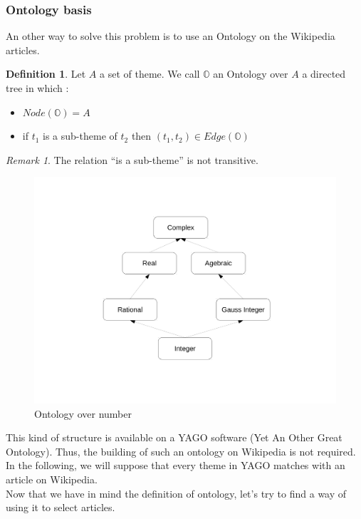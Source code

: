 \documentclass[11pt]{article}
\theoremstyle{plain}
\theoremstyle{definition}
\newtheorem{defn}{Definition}[section]
\theoremstyle{remark}
\newtheorem*{rem}{Remark}
\begin{document}
\subsubsection{Ontology basis}

An other way to solve this problem is to use an Ontology on the Wikipedia articles.

\vspace*{5mm}
\begin{defn}
  Let $A$ a set of theme. We call $\mathbb{O}$ an Ontology over $A$ a directed tree in which :
  \begin{itemize}
  \item $ Node(\mathbb{O}) = A$
  \item if $t_1$ is a sub-theme of $t_2$ then $(t_1,t_2) \in Edge(\mathbb{O})$
  \end{itemize}
\end{defn}

\vspace*{5mm}

\begin{rem}
  The relation ``is a sub-theme'' is not transitive.
\end{rem}

\begin{figure}[!h]
	\centering
    \includegraphics[scale = 0.3]{ExOntology.pdf}
    \caption{Ontology over number}
\end{figure}

This kind of structure is available on a YAGO software (Yet An Other Great Ontology). Thus, the building of such an ontology on Wikipedia is not required. In the following, we will suppose that every theme in YAGO matches with an article on Wikipedia. \\
Now that we have in mind the definition of ontology, let's try to find a way of using it to select articles.\\
\end{document}
